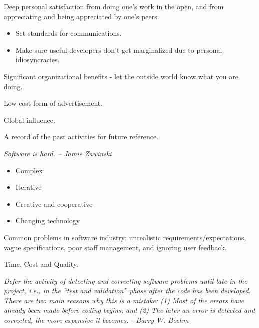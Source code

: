 \documentclass[landscape,30pt]{foils}
\begin{document}
Deep personal satisfaction from doing one's work in the open, and from appreciating and being appreciated by one's peers.

\begin{itemize}
\item Set standards for communications.
\item Make sure useful developers don't get marginalized due to personal idiosyncracies.
\end{itemize}



Significant organizational benefits - let the outside world know what
you are doing.

Low-cost form of advertisement.

Global influence.

A record of the past activities for future reference.







{\em Software is hard.  --  Jamie Zawinski}

\begin{itemize}
\item Complex
\item Iterative
\item Creative and cooperative
\item Changing technology
\end{itemize}

Common problems in software industry: unrealistic
requirements/expectations, vague specifications, poor staff
management, and ignoring user feedback.


Time, Cost and Quality.


{\em Defer the activity of detecting and correcting software problems
until late in the project, i.e., in the “test and validation” phase
after the code has been developed. There are two main reasons why
this is a mistake: (1) Most of the errors have already been made
before coding begins; and (2) The later an error is detected and
corrected, the more expensive it becomes.  - Barry W. Boehm}
\end{document}
